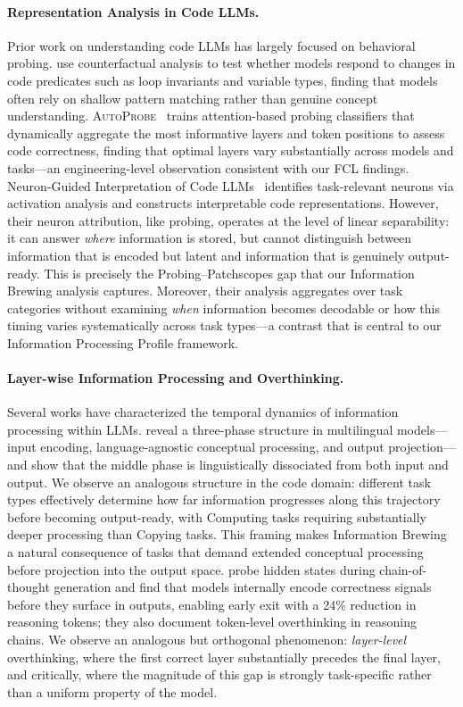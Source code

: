 \documentclass[11pt]{article}
\begin{document}
\paragraph{Representation Analysis in Code LLMs.}
Prior work on understanding code LLMs has largely focused on behavioral probing.
\citet{hooda2024counterfactual} use counterfactual analysis to test whether models respond to changes in code predicates such as loop invariants and variable types, finding that models often rely on shallow pattern matching rather than genuine concept understanding.
\textsc{AutoProbe}~\citep{autoprobe2025} trains attention-based probing classifiers that dynamically aggregate the most informative layers and token positions to assess code correctness, finding that optimal layers vary substantially across models and tasks---an engineering-level observation consistent with our FCL findings.
Neuron-Guided Interpretation of Code LLMs~\citep{neuronguided2026} identifies task-relevant neurons via activation analysis and constructs interpretable code representations.
However, their neuron attribution, like probing, operates at the level of linear separability: it can answer \emph{where} information is stored, but cannot distinguish between information that is encoded but latent and information that is genuinely output-ready.
This is precisely the Probing--Patchscopes gap that our Information Brewing analysis captures.
Moreover, their analysis aggregates over task categories without examining \emph{when} information becomes decodable or how this timing varies systematically across task types---a contrast that is central to our Information Processing Profile framework.
 
\paragraph{Layer-wise Information Processing and Overthinking.}
Several works have characterized the temporal dynamics of information processing within LLMs.
\citet{wendler2024llamas} reveal a three-phase structure in multilingual models---input encoding, language-agnostic conceptual processing, and output projection---and show that the middle phase is linguistically dissociated from both input and output.
We observe an analogous structure in the code domain: different task types effectively determine how far information progresses along this trajectory before becoming output-ready, with Computing tasks requiring substantially deeper processing than Copying tasks.
This framing makes Information Brewing a natural consequence of tasks that demand extended conceptual processing before projection into the output space.
\citet{selfverify2025} probe hidden states during chain-of-thought generation and find that models internally encode correctness signals before they surface in outputs, enabling early exit with a 24\% reduction in reasoning tokens; they also document token-level overthinking in reasoning chains.
We observe an analogous but orthogonal phenomenon: \emph{layer-level} overthinking, where the first correct layer substantially precedes the final layer, and critically, where the magnitude of this gap is strongly task-specific rather than a uniform property of the model.
 
\end{document}
